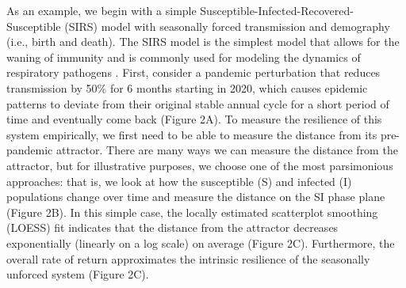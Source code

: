 \documentclass[12pt]{article}
\begin{document}
As an example, we begin with a simple Susceptible-Infected-Recovered-Susceptible (SIRS) model with seasonally forced transmission and demography (i.e., birth and death).
The SIRS model is the simplest model that allows for the waning of immunity and is commonly used for modeling the dynamics of respiratory pathogens \citep{dushoff2004dynamical}.
First, consider a pandemic perturbation that reduces transmission by 50\% for 6 months starting in 2020, which causes epidemic patterns to deviate from their original stable annual cycle for a short period of time and eventually come back (Figure 2A).
To measure the resilience of this system empirically, we first need to be able to measure the distance from its pre-pandemic attractor.
There are many ways we can measure the distance from the attractor, but for illustrative purposes, we choose one of the most parsimonious approaches: that is, we look at how the susceptible (S) and infected (I) populations change over time and measure the distance on the SI phase plane (Figure 2B).
In this simple case, the locally estimated scatterplot smoothing (LOESS) fit indicates that the distance from the attractor decreases exponentially (linearly on a log scale) on average (Figure 2C).
Furthermore, the overall rate of return approximates the intrinsic resilience of the seasonally unforced system (Figure 2C).
\end{document}
